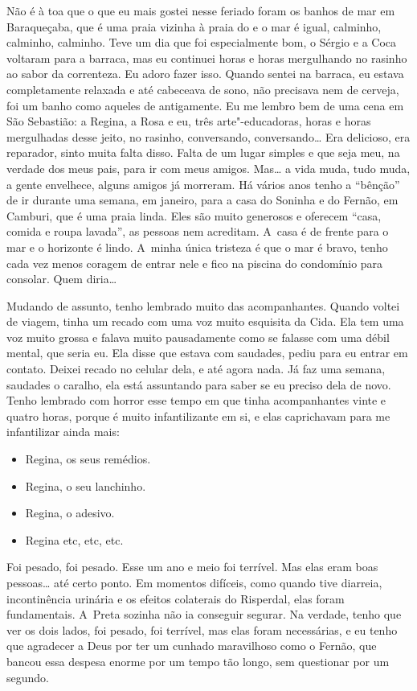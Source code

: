 Não é à toa que o que eu mais gostei nesse feriado foram os banhos de
mar em Baraqueçaba, que é uma praia vizinha à praia do  e o mar é
igual, calminho, calminho, calminho. Teve um dia que foi especialmente
bom, o Sérgio e a Coca voltaram para a barraca, mas eu continuei horas e
horas mergulhando no rasinho ao sabor da correnteza. Eu adoro fazer
isso. Quando sentei na barraca, eu estava completamente relaxada e até
cabeceava de sono, não precisava nem de cerveja, foi um banho como
aqueles de antigamente. Eu me lembro bem de uma cena em São Sebastião: a
Regina, a Rosa e eu, três arte"-educadoras, horas e horas mergulhadas
desse jeito, no rasinho, conversando, conversando… Era delicioso,
era reparador, sinto muita falta disso. Falta de um lugar simples e que
seja meu, na verdade dos meus pais, para ir com meus amigos. Mas…
a vida muda, tudo muda, a gente envelhece, alguns amigos já morreram. Há
vários anos tenho a ``bênção'' de ir durante uma semana, em janeiro,
para a casa do Soninha e do Fernão, em Camburi, que é uma praia linda.
Eles são muito generosos e oferecem ``casa, comida e roupa lavada'', as
pessoas nem acreditam. A~casa é de frente para o mar e o horizonte é
lindo. A~minha única tristeza é que o mar é bravo, tenho cada vez menos
coragem de entrar nele e fico na piscina do condomínio para consolar.
Quem diria…

Mudando de assunto, tenho lembrado muito das acompanhantes. Quando
voltei de viagem, tinha um recado com uma voz muito esquisita da Cida.
Ela tem uma voz muito grossa e falava muito pausadamente como se falasse
com uma débil mental, que seria eu. Ela disse que estava com saudades,
pediu para eu entrar em contato. Deixei recado no celular dela, e até
agora nada. Já faz uma semana, saudades o caralho, ela está assuntando
para saber se eu preciso dela de novo. Tenho lembrado com horror esse
tempo em que tinha acompanhantes vinte e quatro horas, porque é muito
infantilizante em si, e elas caprichavam para me infantilizar ainda
mais:

\begin{itemize}
\item
  Regina, os seus remédios.
\item
  Regina, o seu lanchinho.
\item
  Regina, o adesivo.
\item
  Regina etc, etc, etc.
\end{itemize}
Foi pesado, foi pesado. Esse um ano e meio foi terrível. Mas elas eram
boas pessoas… até certo ponto. Em momentos difíceis, como
quando tive diarreia, incontinência urinária e os efeitos colaterais do
Risperdal, elas foram fundamentais. A~Preta sozinha não ia conseguir
segurar. Na verdade, tenho que ver os dois lados, foi pesado, foi
terrível, mas elas foram necessárias, e eu tenho que agradecer a Deus
por ter um cunhado maravilhoso como o Fernão, que bancou essa despesa
enorme por um tempo tão longo, sem questionar por um segundo.

